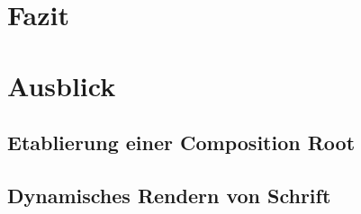 \documentclass[12pt,a4paper,listof=totocnumbered,parskip=half,numbers=noenddot]{scrartcl}
\begin{document}
% 
% 
% 
% 
% 
% 

\pagebreak
\section{Fazit}
\pagebreak
\section{Ausblick}
\subsection{Etablierung einer Composition Root}

\subsection{Dynamisches Rendern von Schrift}
\end{document}
